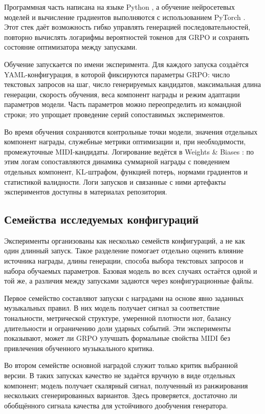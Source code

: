 \documentclass[a4paper,12pt]{extarticle}
\begin{document}
Программная часть написана на языке Python \cite{python2026}, а
обучение нейросетевых моделей и вычисление градиентов выполняются с
использованием PyTorch \cite{pytorch2019}. Этот стек даёт возможность гибко
управлять генерацией последовательностей, повторно
вычислять логарифмы вероятностей токенов для GRPO и сохранять состояние
оптимизатора между запусками.

Обучение запускается по имени эксперимента. Для каждого запуска
создаётся YAML-конфигурация, в которой фиксируются параметры GRPO:
число текстовых запросов на шаг, число генерируемых кандидатов,
максимальная длина генерации, скорость обучения, веса компонент награды и
режим адаптации параметров модели. Часть параметров можно переопределить
из командной строки; это упрощает проведение серий
сопоставимых экспериментов.

Во время обучения сохраняются контрольные точки модели, значения
отдельных компонент награды, служебные метрики оптимизации и,
при необходимости, промежуточные MIDI-кандидаты. Логирование ведётся в
Weights \& Biases \cite{wandb2026}: по этим логам сопоставляются динамика суммарной награды
с поведением отдельных компонент, KL-штрафом, функцией потерь, нормами градиентов
и статистикой валидности. Логи запусков и связанные с ними артефакты
экспериментов доступны в материалах репозитория.

\subsection{Семейства исследуемых конфигураций}

Эксперименты организованы как несколько семейств конфигураций, а не как один
длинный запуск. Такое разделение помогает отдельно оценить влияние источника
награды, длины генерации, способа выбора текстовых запросов и набора обучаемых
параметров. Базовая модель во всех случаях остаётся одной и той же, а различия
между запусками задаются через конфигурационные файлы.

Первое семейство составляют запуски с наградами на основе явно заданных
музыкальных правил. В них модель получает сигнал за соответствие тональности,
метрической структуре, умеренной плотности нот, балансу длительности и
ограничению доли ударных событий. Эти эксперименты показывают, может ли GRPO
улучшать формальные свойства MIDI без привлечения обученного музыкального
критика.

Во втором семействе основной наградой служит только критик выбранной версии.
В таких запусках качество не задаётся вручную в виде отдельных
компонент; модель получает скалярный сигнал, полученный из ранжирования
нескольких сгенерированных вариантов. Здесь проверяется, достаточно ли
обобщённого сигнала качества для устойчивого дообучения генератора.
\end{document}
